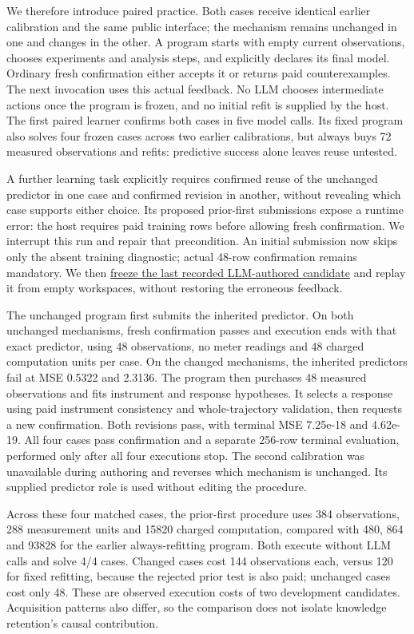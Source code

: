 \documentclass[11pt,a4paper]{article}
\begin{document}
We therefore introduce paired practice. Both cases receive identical earlier
calibration and the same public interface; the mechanism remains unchanged in
one and changes in the other. A program starts with empty current observations,
chooses experiments and analysis steps, and explicitly declares its final model.
Ordinary fresh confirmation either accepts it or returns paid counterexamples.
The next invocation uses this actual feedback. No LLM chooses intermediate actions
once the program is frozen, and no initial refit is supplied by the host. The
first paired learner confirms both cases in five model calls. Its fixed program
also solves four frozen cases across two earlier calibrations, but always buys
72 measured observations and refits: predictive success alone leaves reuse untested.


A further learning task explicitly requires confirmed reuse of the unchanged
predictor in one case and confirmed revision in another, without revealing which
case supports either choice. Its proposed prior-first submissions expose a runtime
error: the host requires paid training rows before allowing fresh confirmation.
We interrupt this run and repair that precondition. An initial submission now
skips only the absent training diagnostic; actual 48-row confirmation remains
mandatory. We then \hyperlink{artifact-63}{freeze the last recorded LLM-authored candidate}
and replay it from empty workspaces, without restoring the erroneous feedback.


The unchanged program first submits the inherited predictor. On both unchanged
mechanisms, fresh confirmation passes and execution ends with that exact predictor,
using 48 observations, no meter readings and 48 charged computation units per case.
On the changed mechanisms, the inherited predictors fail at MSE 0.5322 and 2.3136.
The program then purchases 48 measured observations and fits instrument and response
hypotheses. It selects a response using paid instrument consistency and whole-trajectory
validation, then requests a new confirmation. Both revisions pass, with terminal
MSE 7.25e-18 and 4.62e-19. All four cases pass confirmation and a separate 256-row
terminal evaluation, performed only after all four executions stop. The second
calibration was unavailable during authoring and reverses which mechanism is
unchanged. Its supplied predictor role is used without editing the procedure.


Across these four matched cases, the prior-first procedure uses 384 observations,
288 measurement units and 15820 charged computation, compared with 480, 864 and
93828 for the earlier always-refitting program. Both execute without LLM calls and
solve 4/4 cases. Changed cases cost 144 observations each, versus 120 for fixed
refitting, because the rejected prior test is also paid; unchanged cases cost only
48. These are observed execution costs of two development candidates. Acquisition
patterns also differ, so the comparison does not isolate knowledge retention's
causal contribution.
\end{document}
